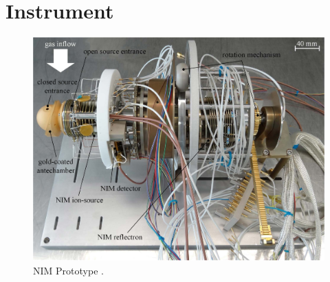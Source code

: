\section{Instrument}\label{sec:setup}
	\begin{figure}[h] %
		\centering
		\includegraphics[width=\textwidth]{Setup/Prototype_totPic.jpg}
		\caption{NIM Prototype \cite{Diss_Meyer}.}
		\label{fig:SetupProto}
	\end{figure}
